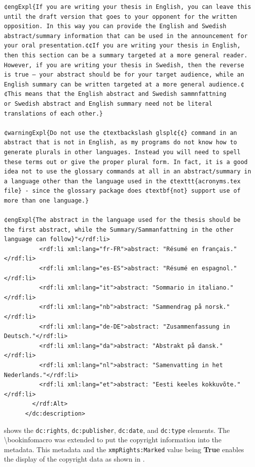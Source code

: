 \begin{lstlisting}[style=myXML,
caption={The \texttt{dc:description} metadata embedded in a PDF file (some reformatting has been done to fit the text in the boarders)}, label={lst:pdfinfoOutputPart7}]
¢engExpl{If you are writing your thesis in English, you can leave this until the draft version that goes to your opponent for the written opposition. In this way you can provide the English and Swedish abstract/summary information that can be used in the announcement for your oral presentation.¢¢If you are writing your thesis in English, then this section can be a summary targeted at a more general reader. However, if you are writing your thesis in Swedish, then the reverse is true – your abstract should be for your target audience, while an English summary can be written targeted at a more general audience.¢¢This means that the English abstract and Swedish sammnfattning
or Swedish abstract and English summary need not be literal translations of each other.}

¢warningExpl{Do not use the ¢textbackslash glspl¢{¢} command in an abstract that is not in English, as my programs do not know how to generate plurals in other languages. Instead you will need to spell these terms out or give the proper plural form. In fact, it is a good idea not to use the glossary commands at all in an abstract/summary in a language other than the language used in the ¢texttt{acronyms.tex file} - since the glossary package does ¢textbf{not} support use of more than one language.}

¢engExpl{The abstract in the language used for the thesis should be the first abstract, while the Summary/Sammanfattning in the other language can follow}"</rdf:li>
          <rdf:li xml:lang="fr-FR">abstract: "Résumé en français."</rdf:li>
          <rdf:li xml:lang="es-ES">abstract: "Résumé en espagnol."</rdf:li>
          <rdf:li xml:lang="it">abstract: "Sommario in italiano."</rdf:li>
          <rdf:li xml:lang="nb">abstract: "Sammendrag på norsk."</rdf:li>
          <rdf:li xml:lang="de-DE">abstract: "Zusammenfassung in Deutsch."</rdf:li>
          <rdf:li xml:lang="da">abstract: "Abstrakt på dansk."</rdf:li>
          <rdf:li xml:lang="nl">abstract: "Samenvatting in het Nederlands."</rdf:li>
          <rdf:li xml:lang="et">abstract: "Eesti keeles kokkuvõte."</rdf:li>
        </rdf:Alt>
      </dc:description>
\end{lstlisting}

 shows the \texttt{dc:rights}, \texttt{dc:publisher}, \texttt{dc:date}, and \texttt{dc:type} elements. The \textbackslash bookinfomacro was extended to put the copyright information into the metadata. This metadata and the \texttt{xmpRights:Marked} value being \textbf{True} enables the display of the copyright data as shown in .

